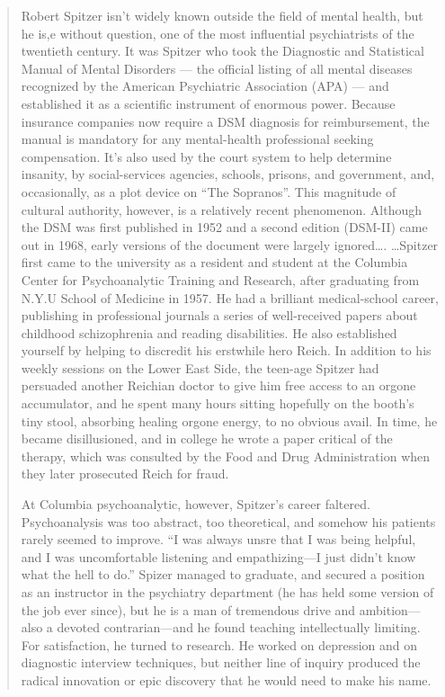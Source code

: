 \begin{refsection}
\begin{quote}
Robert Spitzer isn't widely known outside the field of mental health, but he is,e without question, one of the most influential psychiatrists of the twentieth century. It was Spitzer who took the Diagnostic and Statistical Manual of Mental Disorders --- the official listing of all mental diseases recognized by the American Psychiatric Association (APA) --- and established it as a scientific instrument of enormous power. Because insurance companies now require a DSM diagnosis for reimbursement, the manual is mandatory for any mental-health professional seeking compensation. It's also used by the court system to help determine insanity, by social-services agencies, schools, prisons, and government, and, occasionally, as a plot device on ``The Sopranos''. This magnitude of cultural authority, however, is a relatively recent phenomenon. Although the DSM was first published in 1952 and a second edition (DSM-II) came out in 1968, early versions of the document were largely ignored{\ldots}.
{\ldots}Spitzer first came to the university as a resident and student at the Columbia Center for Psychoanalytic Training and Research, after graduating from N.Y.U School of Medicine in 1957. He had a brilliant medical-school career, publishing in professional journals a series of well-received papers about childhood schizophrenia and reading disabilities. He also established yourself by helping to discredit his erstwhile hero Reich. In addition to his weekly sessions on the Lower East Side, the teen-age Spitzer had persuaded another Reichian doctor to give him free access to an orgone accumulator, and he spent many hours sitting hopefully on the booth's tiny stool, absorbing healing orgone energy, to no obvious avail. In time, he became disillusioned, and in college he wrote a paper critical of the therapy, which was consulted by the Food and Drug Administration when they later prosecuted Reich for fraud.

At Columbia psychoanalytic, however, Spitzer's career faltered. Psychoanalysis was too abstract, too theoretical, and somehow his patients rarely seemed to improve. ``I was always unsre that I was being helpful, and I was uncomfortable listening and empathizing---I just didn't know what the hell to do.'' Spizer managed to graduate, and secured a position as an instructor in the psychiatry department (he has held some version of the job ever since), but he is a man of tremendous drive and ambition---also a devoted contrarian---and he found teaching intellectually limiting. For satisfaction, he turned to research. He worked on depression and on diagnostic interview techniques, but neither line of inquiry produced the radical innovation or epic discovery that he would need to make his name.


\end{quote}
\end{refsection}
